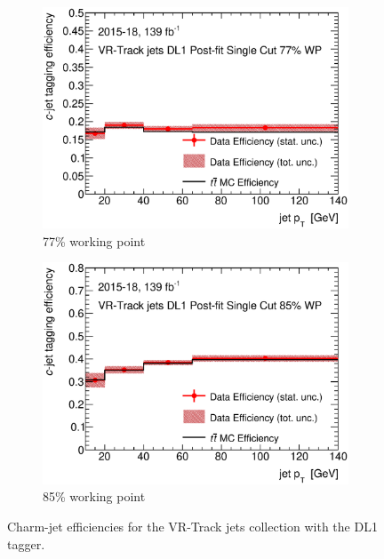 \documentclass[letterpaper,12pt]{article}
\begin{document}
\begin{figure}[H]
\begin{subfigure}[t]{.35\linewidth}
		\includegraphics[width=1\textwidth]{FTAG_plots/DL1allVRJetsDec/eff77.eps}
		\caption{77\% working point}
		\end{subfigure}
		\begin{subfigure}[t]{.35\linewidth}
		\includegraphics[width=1\textwidth]{FTAG_plots/DL1allVRJetsDec/eff85.eps}
		\caption{85\% working point}
		\end{subfigure}
	\caption{Charm-jet efficiencies for the VR-Track jets collection with
	the DL1 tagger.} \label{fig:Dec_eff_VRJets_DL1}
	\end{figure}
\end{document}
